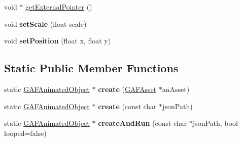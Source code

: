 \begin{DoxyCompactItemize}
\item 
void $\ast$ \hyperlink{class_g_a_f_1_1_g_a_f_animated_object_a65a5c857f505dd49bfe79af9dc926029}{get\-External\-Pointer} ()
\item 
\hypertarget{class_g_a_f_1_1_g_a_f_animated_object_ab34acd90084bd1ec695fd0d75f44d489}{void {\bfseries set\-Scale} (float scale)}\label{class_g_a_f_1_1_g_a_f_animated_object_ab34acd90084bd1ec695fd0d75f44d489}

\item 
\hypertarget{class_g_a_f_1_1_g_a_f_animated_object_aa008fe6a22ccce7f26de52139fae449d}{void {\bfseries set\-Position} (float x, float y)}\label{class_g_a_f_1_1_g_a_f_animated_object_aa008fe6a22ccce7f26de52139fae449d}

\end{DoxyCompactItemize}
\subsection*{Static Public Member Functions}
\begin{DoxyCompactItemize}
\item 
\hypertarget{class_g_a_f_1_1_g_a_f_animated_object_a7200ca8e3895bb081f316bb9a71c9b87}{static \hyperlink{class_g_a_f_1_1_g_a_f_animated_object}{G\-A\-F\-Animated\-Object} $\ast$ {\bfseries create} (\hyperlink{class_g_a_f_1_1_g_a_f_asset}{G\-A\-F\-Asset} $\ast$an\-Asset)}\label{class_g_a_f_1_1_g_a_f_animated_object_a7200ca8e3895bb081f316bb9a71c9b87}

\item 
\hypertarget{class_g_a_f_1_1_g_a_f_animated_object_ab2dc40198c5fe06c6bed662ded060a59}{static \hyperlink{class_g_a_f_1_1_g_a_f_animated_object}{G\-A\-F\-Animated\-Object} $\ast$ {\bfseries create} (const char $\ast$json\-Path)}\label{class_g_a_f_1_1_g_a_f_animated_object_ab2dc40198c5fe06c6bed662ded060a59}

\item 
\hypertarget{class_g_a_f_1_1_g_a_f_animated_object_a0045c80ebcc4c9645249f5aa0c6ee48f}{static \hyperlink{class_g_a_f_1_1_g_a_f_animated_object}{G\-A\-F\-Animated\-Object} $\ast$ {\bfseries create\-And\-Run} (const char $\ast$json\-Path, bool looped=false)}\label{class_g_a_f_1_1_g_a_f_animated_object_a0045c80ebcc4c9645249f5aa0c6ee48f}

\end{DoxyCompactItemize}
